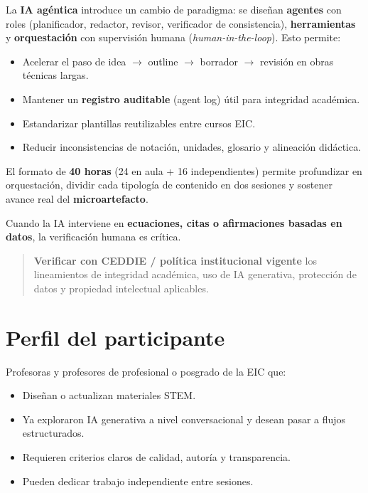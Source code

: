 La \textbf{IA agéntica} introduce un cambio de paradigma: se diseñan \textbf{agentes} con roles (planificador, redactor, revisor, verificador de consistencia), \textbf{herramientas} y \textbf{orquestación} con supervisión humana (\emph{human-in-the-loop}). Esto permite:

\begin{itemize}
\item Acelerar el paso de idea $\rightarrow$ outline $\rightarrow$ borrador $\rightarrow$ revisión en obras técnicas largas.
\item Mantener un \textbf{registro auditable} (agent log) útil para integridad académica.
\item Estandarizar plantillas reutilizables entre cursos EIC.
\item Reducir inconsistencias de notación, unidades, glosario y alineación didáctica.
\end{itemize}

El formato de \textbf{40 horas} (24 en aula + 16 independientes) permite profundizar en orquestación, dividir cada tipología de contenido en dos sesiones y sostener avance real del \textbf{microartefacto}.

Cuando la IA interviene en \textbf{ecuaciones, citas o afirmaciones basadas en datos}, la verificación humana es crítica.

\begin{quote}
\textbf{Verificar con CEDDIE / política institucional vigente} los lineamientos de integridad académica, uso de IA generativa, protección de datos y propiedad intelectual aplicables.
\end{quote}

\section{Perfil del participante}

Profesoras y profesores de profesional o posgrado de la EIC que:

\begin{itemize}
\item Diseñan o actualizan materiales STEM.
\item Ya exploraron IA generativa a nivel conversacional y desean pasar a flujos estructurados.
\item Requieren criterios claros de calidad, autoría y transparencia.
\item Pueden dedicar trabajo independiente entre sesiones.
\end{itemize}

